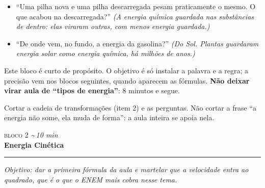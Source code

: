 \documentclass[11pt,a4paper]{article}
\newcommand{\bloco}[3]{%
  \needspace{7\baselineskip}
  \vspace{1.8em}
  {\scshape\color{vinho}bloco #1}\hfill
    {\small\itshape\color{grafite}\textasciitilde\,#3 min}\\[0.1em]
  {\Large\bfseries #2}\\[-0.55em]
  {\color{black!30}\rule{\linewidth}{0.5pt}}
  \par\nobreak\smallskip
}
\newcommand{\objetivo}[1]{{\itshape\color{grafite}Objetivo: #1}\par\smallskip}
\begin{document}
\begin{perguntas}
\begin{itemize}[nosep]
  \item ``Uma pilha nova e uma pilha descarregada pesam praticamente o
        mesmo. O que acabou na descarregada?''
        \textit{(A energia qu\'imica guardada nas subst\^ancias de
        dentro: elas viraram outras, com menos energia guardada.)}
  \item ``De onde vem, no fundo, a energia da gasolina?''
        \textit{(Do Sol. Plantas guardaram energia solar como energia
        qu\'imica, h\'a milh\~oes de anos.)}
\end{itemize}
\end{perguntas}

\begin{obs}
Este bloco \'e curto de prop\'osito. O objetivo \'e s\'o instalar a
palavra e a regra; a precis\~ao vem nos blocos seguintes, quando
aparecem as f\'ormulas. \textbf{N\~ao deixar virar aula de ``tipos de
energia''}: 8 minutos e segue.
\end{obs}

\begin{corte}
Cortar a cadeia de transforma\c{c}\~oes (item 2) e as perguntas. N\~ao
cortar a frase ``a energia n\~ao some, ela muda de forma'': a aula
inteira se apoia nela.
\end{corte}

\bloco{2}{Energia Cin\'etica}{10}

\objetivo{dar a primeira f\'ormula da aula e martelar que a velocidade
entra ao quadrado, que \'e o que o ENEM mais cobra nesse tema.}
\end{document}
